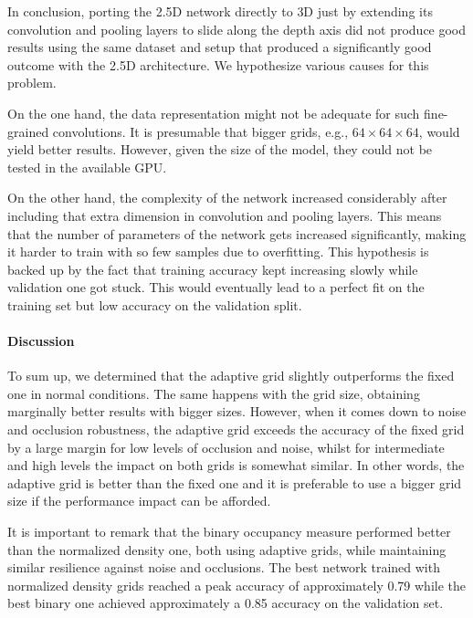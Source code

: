 In conclusion, porting the \acs{2.5D} network directly to \acs{3D} just by extending its convolution and pooling layers to slide along the depth axis did not produce good results using the same dataset and setup that produced a significantly good outcome with the \acs{2.5D} architecture. We hypothesize various causes for this problem.

On the one hand, the data representation might not be adequate for such fine-grained convolutions. It is presumable that bigger grids, e.g., $64\times64\times64$, would yield better results. However, given the size of the model, they could not be tested in the available GPU.

On the other hand, the complexity of the network increased considerably after including that extra dimension in convolution and pooling layers. This means that the number of parameters of the network gets increased significantly, making it harder to train with so few samples due to overfitting. This hypothesis is backed up by the fact that training accuracy kept increasing slowly while validation one got stuck. This would eventually lead to a perfect fit on the training set but low accuracy on the validation split.

\paragraph{Discussion}

To sum up, we determined that the adaptive grid slightly outperforms the fixed one in normal conditions. The same happens with the grid size, obtaining marginally better results with bigger sizes. However, when it comes down to noise and occlusion robustness, the adaptive grid exceeds the accuracy of the fixed grid by a large margin for low levels of occlusion and noise, whilst for intermediate and high levels the impact on both grids is somewhat similar. In other words, the adaptive grid is better than the fixed one and it is preferable to use a bigger grid size if the performance impact can be afforded.

It is important to remark that the binary occupancy measure performed better than the normalized density one, both using adaptive grids, while maintaining similar resilience against noise and occlusions. The best network trained with normalized density grids reached a peak accuracy of approximately 0.79 while the best binary one achieved approximately a 0.85 accuracy on the validation set.

